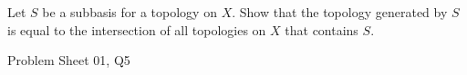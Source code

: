 \begin{samepage}
\begin{ex}
Let $S$ be a subbasis for a topology on $X$. Show that the topology generated by $S$ is equal to the intersection of all topologies on $X$ that contains $S$.
\end{ex}
\begin{source}
Problem Sheet 01, Q5
\end{source}
\end{samepage}
